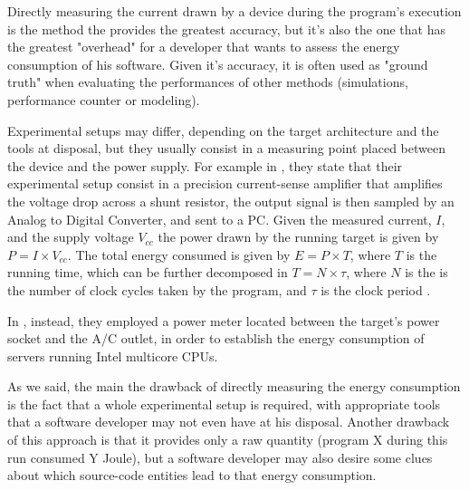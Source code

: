 Directly measuring the current drawn by a device during the program's execution is the method the provides the greatest accuracy, but it's also the one that has the greatest "overhead" for a developer that wants to assess the energy consumption of his software. \newline 
Given it's accuracy, it is often used as "ground truth" when evaluating the performances of other methods (simulations, performance counter or modeling). 
\par Experimental setups may differ, depending on the target architecture and the tools at disposal, but they usually consist in a measuring point placed between the device and the power supply. For example in \cite{roth}, they state that their experimental setup consist in a precision current-sense amplifier that amplifies the voltage drop across a shunt resistor, the output signal is then sampled by an Analog to Digital Converter, and sent to a PC. \newline
Given the measured current, $I$, and the supply voltage $V_{cc}$ the power drawn by the running target is given by $P = I \times V_{cc}$. The total energy consumed is given by $E = P \times T$, where $T$ is the running time, which can be further decomposed in $T = N \times \tau$, where $N$ is the is the number of clock cycles taken by the program, and $\tau$ is the clock period \cite{tiwari}.
\par In \cite{fahad}, instead, they employed a power meter located between the target's power socket and the A/C outlet, in order to establish the energy consumption of servers running Intel multicore CPUs.
\par As we said, the main the drawback of directly measuring the energy consumption is the fact that a whole experimental setup is required, with appropriate tools that a software developer may not even have at his disposal. Another drawback of this approach is that it provides only a raw quantity (program X during this run consumed Y Joule), but a software developer may also desire some clues about which source-code entities lead to that energy consumption.

